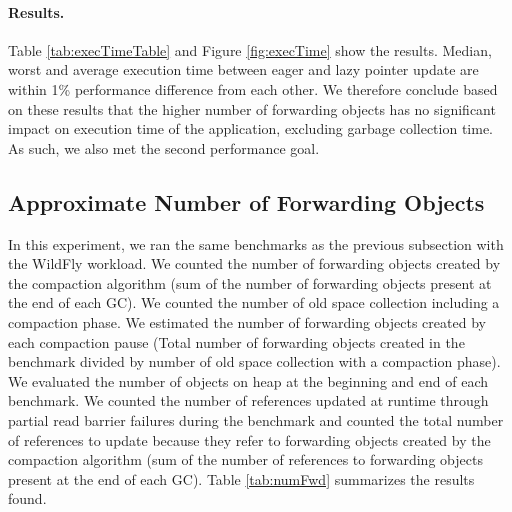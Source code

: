 \documentclass[sigplan,10pt,screen]{acmart}\settopmatter{printfolios=true,printccs=true,printacmref=true}
\begin{document}
\paragraph{Results.}
Table \ref{tab:execTimeTable} and Figure \ref{fig:execTime} show the results. Median, worst and average execution time between eager and lazy pointer update are within 1\% performance difference from each other. We therefore conclude based on these results that the higher number of forwarding objects has no significant impact on execution time of the application, excluding garbage collection time. As such, we also met the second performance goal.

\subsection{Approximate Number of Forwarding Objects}

In this experiment, we ran the same benchmarks as the previous subsection with the WildFly workload. We counted the number of forwarding objects created by the compaction algorithm (sum of the number of forwarding objects present at the end of each GC). We counted the number of old space collection including a compaction phase. We estimated the number of forwarding objects created by each compaction pause (Total number of forwarding objects created in the benchmark divided by number of old space collection with a compaction phase). We evaluated the number of objects on heap at the beginning and end of each benchmark. We counted the number of references updated at runtime through partial read barrier failures during the benchmark and counted the total number of references to update because they refer to forwarding objects created by the compaction algorithm (sum of the number of references to forwarding objects present at the end of each GC). Table \ref{tab:numFwd} summarizes the results found. 
\end{document}
